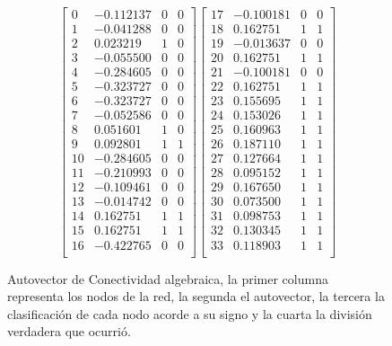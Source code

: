\vspace{1em}
\begin{figure}[!htbp]
\begin{equation*}
    \begin{bmatrix}
        0   &-0.112137 & 0 & 0 \\ 
        1   &-0.041288 & 0 & 0 \\
        2   &0.023219  & 1 & 0 \\
        3   &-0.055500 & 0 & 0 \\
        4   &-0.284605 & 0 & 0 \\
        5   &-0.323727 & 0 & 0 \\
        6   &-0.323727 & 0 & 0 \\
        7   &-0.052586  & 0 & 0 \\
        8   &0.051601 & 1 & 0 \\
        9   &0.092801 & 1 & 1 \\
        10  &-0.284605  & 0 & 0 \\
        11  &-0.210993  & 0 & 0 \\
        12  &-0.109461  & 0 & 0 \\
        13  &-0.014742  & 0 & 0 \\
        14  &0.162751 & 1 & 1 \\
        15  &0.162751 & 1 & 1 \\
        16  &-0.422765  & 0 & 0 \\
\end{bmatrix}
\begin{bmatrix}
        17  &-0.100181  & 0 & 0 \\
        18  &0.162751 & 1 & 1 \\
        19  &-0.013637  & 0 & 0 \\
        20  &0.162751 & 1 & 1 \\
        21  &-0.100181  & 0 & 0 \\
        22  &0.162751 & 1 & 1 \\
        23  &0.155695 & 1 & 1 \\
        24  &0.153026 & 1 & 1 \\
        25  &0.160963 & 1 & 1 \\
        26  &0.187110 & 1 & 1 \\
        27  &0.127664 & 1 & 1 \\
        28  &0.095152 & 1 & 1 \\
        29  &0.167650 & 1 & 1 \\
        30  &0.073500 & 1 & 1 \\
        31  &0.098753 & 1 & 1 \\
        32  &0.130345 & 1 & 1 \\
        33  &0.118903 & 1 & 1 \\
    \end{bmatrix}
\end{equation*}
\caption{Autovector de Conectividad algebraica, la primer columna representa los nodos de la red, la segunda el autovector, la tercera la clasificación de cada nodo acorde a su signo y la cuarta la división verdadera que ocurrió.} \label{prediccion_karate}
\end{figure}

